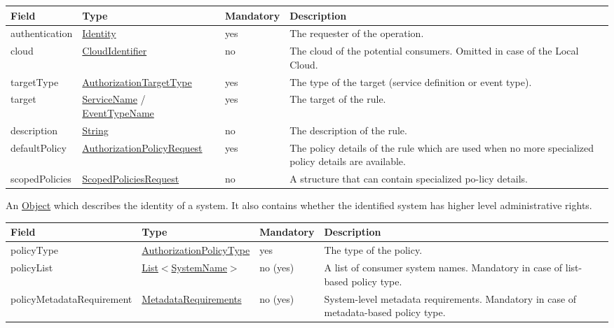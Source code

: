 \documentclass[a4paper]{arrowhead}
\newcommand{\pref}[1]{{\textcolor{ArrowheadGrey}{\hyperref[sec:model:primitives:#1]{#1}}}}
\begin{document}
{}
 
\begin{table}[ht!]
\begin{tabularx}{\textwidth}{| p{3cm} | p{4.5cm} | p{2cm} | X |} \hline
\rowcolor{gray!33} Field & Type & Mandatory & Description \\ \hline
authentication &\hyperref[sec:model:Identity]{Identity} & yes & The requester of the operation. \\ \hline
cloud & \pref{CloudIdentifier} & no & The cloud of the potential consumers. Omitted in case of the Local Cloud. \\ \hline
targetType & \pref{AuthorizationTargetType} & yes & The type of the target (service definition or event type). \\ \hline
target & \pref{ServiceName} / \pref{EventTypeName} & yes & The target of the rule. \\ \hline
description & \pref{String} & no & The description of the rule. \\ \hline
defaultPolicy & \hyperref[sec:model:AuthorizationPolicyRequest]{AuthorizationPolicyRequest} & yes & The policy details of the rule which are used when no more specialized policy details are available. \\ \hline
scopedPolicies & \hyperref[sec:model:ScopedPoliciesRequest]{ScopedPoliciesRequest} & no & A structure that can contain specialized po-licy details. \\ \hline
\end{tabularx}
\end{table}


An \pref{Object} which describes the identity of a system. It also contains whether the identified system has higher level administrative rights.


\begin{table}[ht!]
\begin{tabularx}{\textwidth}{| p{4.3cm} | p{4.1cm} | p{2cm} | X |} \hline
\rowcolor{gray!33} Field & Type & Mandatory & Description \\ \hline
policyType & \pref{AuthorizationPolicyType} & yes & The type of the policy. \\ \hline
policyList & \pref{List}$<$\pref{SystemName}$>$ & no (yes) & A list of consumer system names. Mandatory in case of list-based policy type. \\ \hline
policyMetadataRequirement & \hyperref[sec:model:MetadataRequirements]{MetadataRequirements} & no (yes) & System-level metadata requirements. Mandatory in case of metadata-based policy type. \\ \hline 
\end{tabularx}
\end{table}
\end{document}
